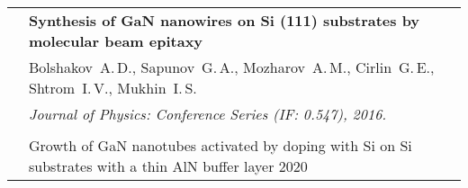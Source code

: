 \documentclass[letterpaper, 11pt]{article}
\begin{document}
\begin{longtable}{p{1.3in}p{4.8in}}
        & \textbf{Synthesis of GaN nanowires on Si (111) substrates by
        molecular beam epitaxy} \\
        & Bolshakov~A.\,D., Sapunov~G.\,A., Mozharov~A.\,M., Cirlin~G.\,E.,
        Shtrom~I.\,V., Mukhin~I.\,S. \\
        & \textit{Journal of Physics: Conference Series (IF: 0.547), 2016.}\\
		& \\

		{\color{OliveGreen}{Patent}}
        & Growth of GaN nanotubes activated by doping with Si on Si substrates
        with a thin AlN buffer layer \hfill 2020\\
		
		
		
		
	\end{longtable}
\end{document}
